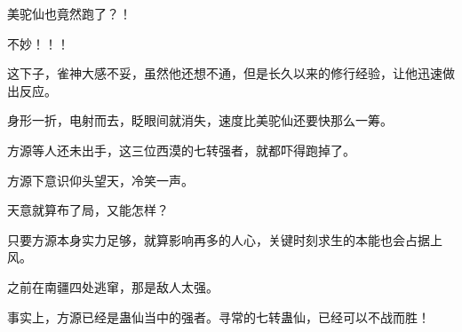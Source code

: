 \begin{this_body}
美驼仙也竟然跑了？！

不妙！！！

这下子，雀神大感不妥，虽然他还想不通，但是长久以来的修行经验，让他迅速做出反应。

身形一折，电射而去，眨眼间就消失，速度比美驼仙还要快那么一筹。

方源等人还未出手，这三位西漠的七转强者，就都吓得跑掉了。

方源下意识仰头望天，冷笑一声。

天意就算布了局，又能怎样？

只要方源本身实力足够，就算影响再多的人心，关键时刻求生的本能也会占据上风。

之前在南疆四处逃窜，那是敌人太强。

事实上，方源已经是蛊仙当中的强者。寻常的七转蛊仙，已经可以不战而胜！

\end{this_body}

